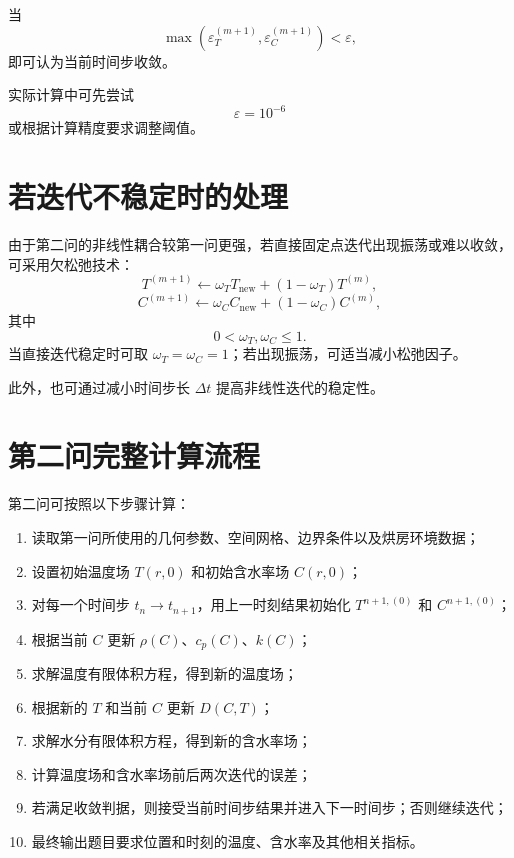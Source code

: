 \documentclass[UTF8,a4paper,12pt]{ctexart}
\begin{document}
当
\begin{equation}
    \max
    \left(
        \varepsilon_T^{(m+1)},
        \varepsilon_C^{(m+1)}
    \right)
    <\varepsilon,
    \label{eq:convergence}
\end{equation}
即可认为当前时间步收敛。

实际计算中可先尝试
\[
\varepsilon=10^{-6}
\]
或根据计算精度要求调整阈值。

\section{若迭代不稳定时的处理}

由于第二问的非线性耦合较第一问更强，若直接固定点迭代出现振荡或难以收敛，可采用欠松弛技术：
\begin{equation}
    T^{(m+1)}
    \leftarrow
    \omega_T T_{\mathrm{new}}
    +(1-\omega_T)T^{(m)},
\end{equation}
\begin{equation}
    C^{(m+1)}
    \leftarrow
    \omega_C C_{\mathrm{new}}
    +(1-\omega_C)C^{(m)},
\end{equation}
其中
\[
0<\omega_T,\omega_C\le 1.
\]
当直接迭代稳定时可取 $\omega_T=\omega_C=1$；若出现振荡，可适当减小松弛因子。

此外，也可通过减小时间步长 $\Delta t$ 提高非线性迭代的稳定性。

\section{第二问完整计算流程}

第二问可按照以下步骤计算：

\begin{enumerate}
    \item 读取第一问所使用的几何参数、空间网格、边界条件以及烘房环境数据；
    \item 设置初始温度场 $T(r,0)$ 和初始含水率场 $C(r,0)$；
    \item 对每一个时间步 $t_n\to t_{n+1}$，用上一时刻结果初始化 $T^{n+1,(0)}$ 和 $C^{n+1,(0)}$；
    \item 根据当前 $C$ 更新 $\rho(C)$、$c_p(C)$、$k(C)$；
    \item 求解温度有限体积方程，得到新的温度场；
    \item 根据新的 $T$ 和当前 $C$ 更新 $D(C,T)$；
    \item 求解水分有限体积方程，得到新的含水率场；
    \item 计算温度场和含水率场前后两次迭代的误差；
    \item 若满足收敛判据，则接受当前时间步结果并进入下一时间步；否则继续迭代；
    \item 最终输出题目要求位置和时刻的温度、含水率及其他相关指标。
\end{enumerate}
\end{document}
